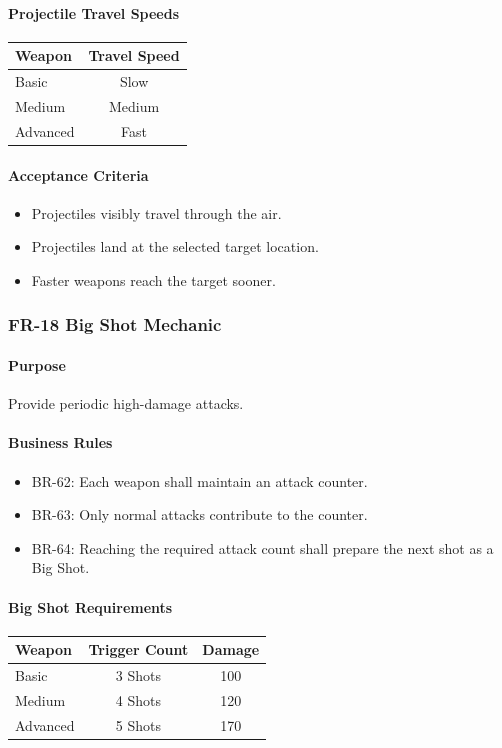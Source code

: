 \documentclass[11pt,a4paper]{article}
\begin{document}
\paragraph{Projectile Travel Speeds}
\begin{center}
\begin{tabular}{lc}
  \toprule
  \textbf{Weapon} & \textbf{Travel Speed} \\
  \midrule
  Basic    & Slow \\
  Medium   & Medium \\
  Advanced & Fast \\
  \bottomrule
\end{tabular}
\end{center}

\paragraph{Acceptance Criteria}
\begin{itemize}
  \item Projectiles visibly travel through the air.
  \item Projectiles land at the selected target location.
  \item Faster weapons reach the target sooner.
\end{itemize}

\subsubsection{FR-18 Big Shot Mechanic}

\paragraph{Purpose}
Provide periodic high-damage attacks.

\paragraph{Business Rules}
\begin{itemize}
  \item BR-62: Each weapon shall maintain an attack counter.
  \item BR-63: Only normal attacks contribute to the counter.
  \item BR-64: Reaching the required attack count shall prepare the next shot as
        a Big Shot.
\end{itemize}

\paragraph{Big Shot Requirements}
\begin{center}
\begin{tabular}{lcc}
  \toprule
  \textbf{Weapon} & \textbf{Trigger Count} & \textbf{Damage} \\
  \midrule
  Basic    & 3 Shots & 100 \\
  Medium   & 4 Shots & 120 \\
  Advanced & 5 Shots & 170 \\
  \bottomrule
\end{tabular}
\end{center}
\end{document}
